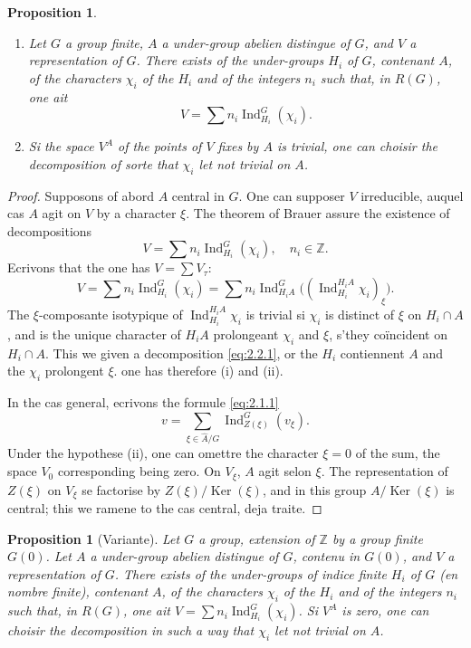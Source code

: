 \documentclass[12pt,a4paper]{article}
\theoremstyle{plain}
\newtheorem{proposition}[theorem]{Proposition}
\theoremstyle{definition}
\theoremstyle{remark}
\DeclareMathOperator{\Ind}{Ind}
\newcommand{\bZ}{\mathbb{Z}}
\providecommand{\Ker}{\operatorname{Ker}}
\begin{document}
\begin{proposition}\label{prop:2.2}
\begin{enumerate}[label=(\roman*)]
\item Let $G$ a group finite, $A$ a under-group abelien distingue of $G$, and $V$ a representation of $G$. There exists of the under-groups $H_i$ of $G$, contenant $A$, of the characters $\chi_i$ of the $H_i$ and of the integers $n_i$ such that, in $R(G)$, one ait
\[
V = \sum n_i \Ind_{H_i}^G(\chi_i).
\]
\item Si the space $V^A$ of the points of $V$ fixes by $A$ is trivial, one can choisir the decomposition of sorte that $\chi_i$ let not trivial on $A$.
\end{enumerate}
\end{proposition}

\begin{proof}
Supposons of abord $A$ central in $G$. One can supposer $V$ irreducible, auquel cas $A$ agit on $V$ by a character $\xi$. The theorem of Brauer assure the existence of decompositions
\begin{equation}\label{eq:2.2.1}
V = \sum n_i \Ind_{H_i}^G(\chi_i), \quad n_i \in \bZ.
\end{equation}
Ecrivons that the one has $V = \sum V_\tau$:
\[
V = \sum n_i \Ind_{H_i}^G(\chi_i) = \sum n_i \Ind_{H_i A}^G\bigl((\Ind_{H_i}^{H_i A} \chi_i)_\xi\bigr).
\]
The $\xi$-composante isotypique of $\Ind_{H_i}^{H_i A} \chi_i$ is trivial si $\chi_i$ is distinct of $\xi$ on $H_i \cap A$, and is the unique character of $H_i A$ prolongeant $\chi_i$ and $\xi$, s'they co\"incident on $H_i \cap A$. This we given a decomposition \eqref{eq:2.2.1}, or the $H_i$ contiennent $A$ and the $\chi_i$ prolongent $\xi$. one has therefore (i) and (ii).

In the cas general, ecrivons the formule \eqref{eq:2.1.1}
\[
v = \sum_{\xi \in \hat{A}/G} \Ind_{Z(\xi)}^G(v_\xi).
\]
Under the hypothese (ii), one can omettre the character $\xi = 0$ of the sum, the space $V_0$ corresponding being zero. On $V_\xi$, $A$ agit selon $\xi$. The representation of $Z(\xi)$ on $V_\xi$ se factorise by $Z(\xi)/\Ker(\xi)$, and in this group $A/\Ker(\xi)$ is central; this we ramene to the cas central, deja traite.
\end{proof}

\begin{proposition}[Variante]\label{prop:2.3}
Let $G$ a group, extension of $\bZ$ by a group finite $G(0)$. Let $A$ a under-group abelien distingue of $G$, contenu in $G(0)$, and $V$ a representation of $G$. There exists of the under-groups of indice finite $H_i$ of $G$ (en nombre finite), contenant $A$, of the characters $\chi_i$ of the $H_i$ and of the integers $n_i$ such that, in $R(G)$, one ait $V = \sum n_i \Ind_{H_i}^G(\chi_i)$. Si $V^A$ is zero, one can choisir the decomposition in such a way that $\chi_i$ let not trivial on $A$.
\end{proposition}
\end{document}
